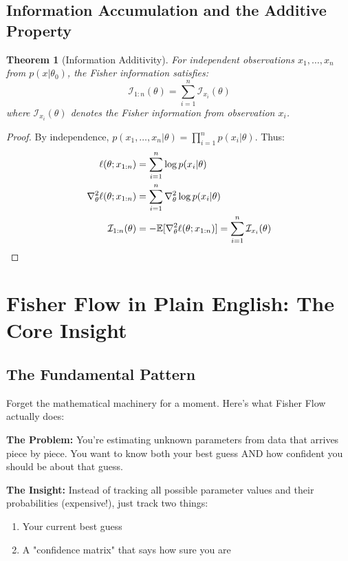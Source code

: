 \documentclass[11pt]{article}
\newtheorem{theorem}{Theorem}
\begin{document}
\subsection{Information Accumulation and the Additive Property}

\begin{theorem}[Information Additivity]
\label{thm:info_add}
For independent observations $x_1, \ldots, x_n$ from $p(x|\theta_0)$, the Fisher information satisfies:
\begin{equation}
\mathcal{I}_{1:n}(\theta) = \sum_{i=1}^n \mathcal{I}_{x_i}(\theta)
\end{equation}
where $\mathcal{I}_{x_i}(\theta)$ denotes the Fisher information from observation $x_i$.
\end{theorem}

\begin{proof}
By independence, $p(x_1, \ldots, x_n|\theta) = \prod_{i=1}^n p(x_i|\theta)$. Thus:
\begin{align}
\ell(\theta; x_{1:n}) &= \sum_{i=1}^n \log p(x_i|\theta)\\
\nabla^2_\theta \ell(\theta; x_{1:n}) &= \sum_{i=1}^n \nabla^2_\theta \log p(x_i|\theta)\\
\mathcal{I}_{1:n}(\theta) &= -\mathbb{E}[\nabla^2_\theta \ell(\theta; x_{1:n})] = \sum_{i=1}^n \mathcal{I}_{x_i}(\theta) \qedhere
\end{align}
\end{proof}

\section{Fisher Flow in Plain English: The Core Insight}

\subsection{The Fundamental Pattern}

Forget the mathematical machinery for a moment. Here's what Fisher Flow actually does:

\textbf{The Problem:} You're estimating unknown parameters from data that arrives piece by piece. You want to know both your best guess AND how confident you should be about that guess.

\textbf{The Insight:} Instead of tracking all possible parameter values and their probabilities (expensive!), just track two things:
\begin{enumerate}
\item Your current best guess
\item A "confidence matrix" that says how sure you are
\end{enumerate}
\end{document}
